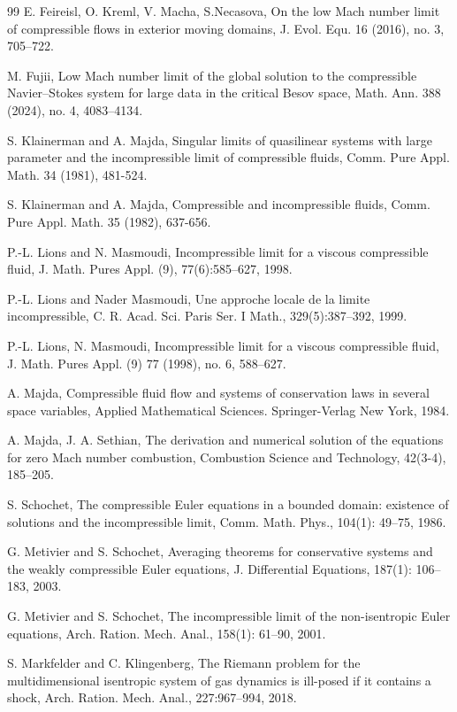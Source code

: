 \documentclass[12pt,reqno]{amsart}
\theoremstyle{definition}
\theoremstyle{remark}
\numberwithin{equation}{section}
\begin{document}
\begin{thebibliography}{99}
 E. Feireisl, O. Kreml, V. Macha, S.Necasova, 
On the low Mach number limit of compressible flows in exterior moving domains, J. Evol. Equ. 16 (2016), no. 3, 705--722.


M. Fujii,  Low Mach number limit of the global solution to the compressible Navier--Stokes system for large data in the critical Besov space, Math. Ann. 388 (2024), no. 4, 4083--4134.


S. Klainerman and A. Majda, Singular limits of quasilinear systems with large
parameter and the incompressible limit of compressible fluids, Comm. Pure Appl. Math. 34 (1981), 481-524.


 S. Klainerman and A. Majda, Compressible and incompressible fluids, Comm.
Pure Appl. Math. 35 (1982), 637-656.


 P.-L. Lions and N. Masmoudi, Incompressible limit for a viscous compressible fluid, J. Math. Pures Appl. (9),
77(6):585--627, 1998.

 P.-L. Lions and Nader Masmoudi, Une approche locale de la limite incompressible, C. R. Acad. Sci. Paris Ser. I Math., 329(5):387--392, 1999.


 P.-L. Lions, N. Masmoudi, Incompressible limit for a viscous compressible fluid, J. Math. Pures Appl. (9) 77 (1998), no. 6, 588--627. 

A. Majda, Compressible fluid flow and systems of conservation laws in several space variables, Applied Mathematical Sciences. Springer-Verlag New York, 1984.

A. Majda, J. A. Sethian, The derivation and numerical solution of the equations for zero Mach number combustion, Combustion Science and Technology, 42(3-4), 185--205.


S. Schochet, The compressible Euler equations in a bounded domain: existence of solutions and the incompressible limit, Comm. Math. Phys., 104(1): 49--75, 1986.


 G. Metivier and S. Schochet, Averaging theorems for conservative systems and the weakly compressible Euler equations, J. Differential Equations, 187(1): 106--183, 2003.

 G. Metivier and S. Schochet, The incompressible limit of the non-isentropic Euler equations, Arch. Ration. Mech. Anal., 158(1): 61--90, 2001.

 S. Markfelder and C. Klingenberg, The Riemann problem for the multidimensional isentropic system of gas dynamics is ill-posed if it contains a shock, Arch. Ration. Mech. Anal., 227:967--994, 2018.



\end{thebibliography}
\end{document}
